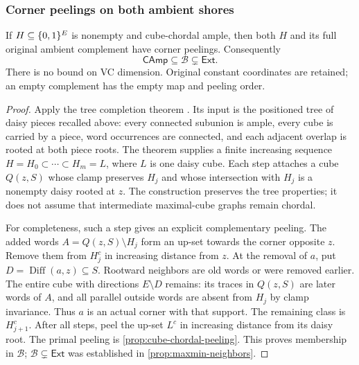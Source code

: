 \begin{samepage}
\subsubsection{Corner peelings on both ambient shores}

\begin{proposition}
\label{prop:atlas-cube-chordal-complement}
If $H\subseteq\{0,1\}^E$ is nonempty and cube-chordal ample, then both $H$
and its full original ambient complement have corner peelings. Consequently
\[
 \mathsf{CAmp}\subseteq\mathcal B\subsetneq\mathsf{Ext}.
\]
There is no bound on VC dimension. Original constant coordinates are retained;
an empty complement has the empty map and peeling order.
\end{proposition}
\end{samepage}
\begin{proof}
Apply the tree completion theorem
\cite[\texttt{prop:leaf-root-alignment}, \texttt{thm:camp-ext}]{CubeComplementCompletion}.
Its input is the positioned tree of daisy pieces recalled above: every
connected subunion is ample, every cube is carried by a piece, word
occurrences are connected, and each adjacent overlap is rooted at both
piece roots. The theorem supplies a finite increasing sequence
$H=H_0\subset\cdots\subset H_m=L$, where $L$ is one daisy cube.
Each step attaches a cube $Q(z,S)$ whose clamp preserves $H_j$ and whose
intersection with $H_j$ is a nonempty daisy rooted at $z$.
The construction preserves the tree properties; it does not assume that
intermediate maximal-cube graphs remain chordal.

For completeness, such a step gives an explicit complementary peeling.
The added words $A=Q(z,S)\setminus H_j$ form an up-set towards the corner
opposite $z$. Remove them from $H_j^c$ in increasing distance from $z$.
At the removal of $a$, put $D=\operatorname{Diff}(a,z)\subseteq S$.
Rootward neighbors are old words or were removed earlier. The entire
cube with directions $E\setminus D$ remains: its traces in $Q(z,S)$
are later words of $A$, and all parallel outside words are absent from
$H_j$ by clamp invariance. Thus $a$ is an actual corner with that support.
The remaining class is $H_{j+1}^c$. After all steps, peel the up-set $L^c$
in increasing distance from its daisy root. The primal peeling is
\cref{prop:cube-chordal-peeling}. This proves membership in $\mathcal B$;
$\mathcal B\subsetneq\mathsf{Ext}$ was established in
\cref{prop:maxmin-neighbors}.
\end{proof}

